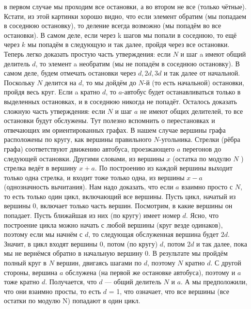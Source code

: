 \documentclass{article}
\begin{document}
в первом случае мы проходим все остановки, а во втором не все (только чётные).
\newline
Кстати, из этой картинки хорошо видно, что если элемент обратим (мы попадаем в соседнюю остановку), то деление всегда возможно (мы попадём во все остановки). В самом деле, если через k шагов мы попали в соседнюю, то ещё через $k$ мы попадём
в следующую и так далее, пройдя через все остановки.
\newline
Теперь легко доказать простую часть утверждения: если $N$ и шаг a имеют общий
делитель $d$, то элемент a необратим (мы не попадём в соседнюю остановку). В самом деле, будем отмечать остановки через $d, 2d, 3d$ и так далее от начальной. Поскольку $N$ делится на $d$, то мы дойдём до $N$-й (то есть начальной) остановки, пройдя весь круг. Если a кратно $d$, то $a$-автобус будет останавливаться только в выделенных остановках, и в соседнюю никогда не попадёт.
\newline
Осталось доказать сложную часть утверждения: если $N$ и шаг $a$ не имеют общих делителей, то все остановки будут обслужены. Тут полезно вспомнить о перестановках и отвечающих им ориентированных графах.
\newline
В нашем случае вершины графа расположены по кругу, как вершины правильного $N$-угольника. Стрелки (рёбра графа) соответствуют движению автобуса, проезжающего $a$ перегонов до следующей остановки. Другими словами, из вершины $x$ (остатка по модулю $N$ ) стрелка ведёт в вершину $x + a$. По построению из каждой
вершины выходит только одна стрелка, и входит тоже только одна, из вершины $x-a$ (однозначность вычитания). Нам надо доказать, что если $a$ взаимно просто с $N$, то есть только один цикл, включающий все вершины.
\newline
Пусть цикл, начатый из вершины 0, включает только часть вершин. Посмотрим, в какие вершины он попадает. Пусть ближайшая из них (по кругу) имеет номер $d$.
Ясно, что построение цикла можно начать с любой вершины (круг везде одинаков), поэтому если мы начнём с $d$, то следующая обслуженная вершина будет $2d$. Значит, в цикл входят вершины 0, потом (по кругу) $d$, потом $2d$ и так далее, пока мы не вернёмся обратно в начальную вершину 0. В результате мы пройдём полный круг в $N$ вершин, двигаясь шагами по $d$, поэтому $N$ кратно $d$. С другой стороны, вершина $a$ обслужена (на первой же остановке автобуса), поэтому и $a$ тоже кратно $d$. Получается, что $d$ — общий делитель $N$ и $a$. А мы предположили, что они взаимно просты, то есть $d$ = 1, что означает, что все вершины (все остатки по модулю N) попадают в один цикл.
\end{document}
